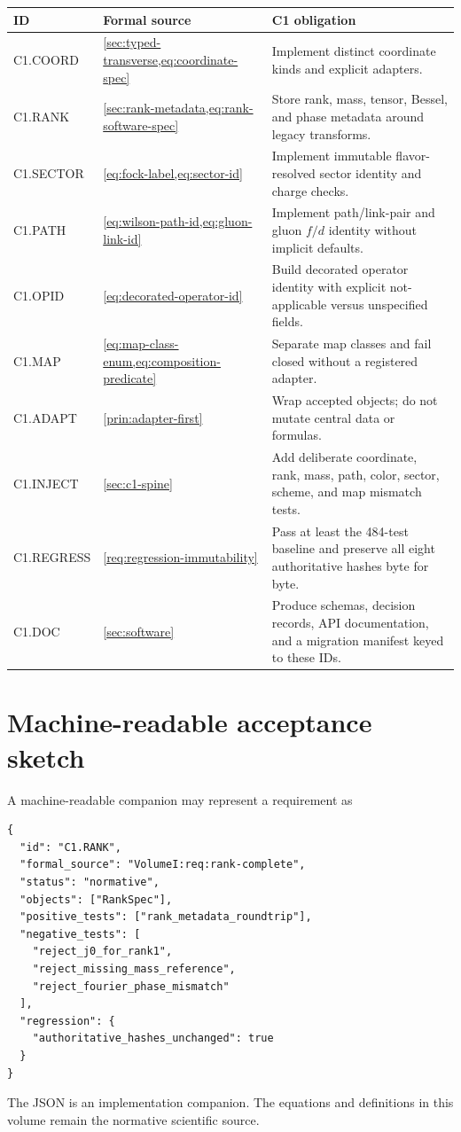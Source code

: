\documentclass[11pt]{article}
\begin{document}
\begin{longtable}{L{0.15\textwidth}L{0.32\textwidth}L{0.43\textwidth}}
\toprule
ID & Formal source & C1 obligation\\
\midrule
\endhead
C1.COORD & \cref{sec:typed-transverse,eq:coordinate-spec} & Implement distinct coordinate kinds and explicit adapters.\\
C1.RANK & \cref{sec:rank-metadata,eq:rank-software-spec} & Store rank, mass, tensor, Bessel, and phase metadata around legacy transforms.\\
C1.SECTOR & \cref{eq:fock-label,eq:sector-id} & Implement immutable flavor-resolved sector identity and charge checks.\\
C1.PATH & \cref{eq:wilson-path-id,eq:gluon-link-id} & Implement path/link-pair and gluon \(f/d\) identity without implicit defaults.\\
C1.OPID & \cref{eq:decorated-operator-id} & Build decorated operator identity with explicit not-applicable versus unspecified fields.\\
C1.MAP & \cref{eq:map-class-enum,eq:composition-predicate} & Separate map classes and fail closed without a registered adapter.\\
C1.ADAPT & \cref{prin:adapter-first} & Wrap accepted objects; do not mutate central data or formulas.\\
C1.INJECT & \cref{sec:c1-spine} & Add deliberate coordinate, rank, mass, path, color, sector, scheme, and map mismatch tests.\\
C1.REGRESS & \cref{req:regression-immutability} & Pass at least the 484-test baseline and preserve all eight authoritative hashes byte for byte.\\
C1.DOC & \cref{sec:software} & Produce schemas, decision records, API documentation, and a migration manifest keyed to these IDs.\\
\bottomrule
\end{longtable}

\section{Machine-readable acceptance sketch}
\label{app:machine-readable}

A machine-readable companion may represent a requirement as
\begin{verbatim}
{
  "id": "C1.RANK",
  "formal_source": "VolumeI:req:rank-complete",
  "status": "normative",
  "objects": ["RankSpec"],
  "positive_tests": ["rank_metadata_roundtrip"],
  "negative_tests": [
    "reject_j0_for_rank1",
    "reject_missing_mass_reference",
    "reject_fourier_phase_mismatch"
  ],
  "regression": {
    "authoritative_hashes_unchanged": true
  }
}
\end{verbatim}
The JSON is an implementation companion.  The equations and definitions in
this volume remain the normative scientific source.
\end{document}

